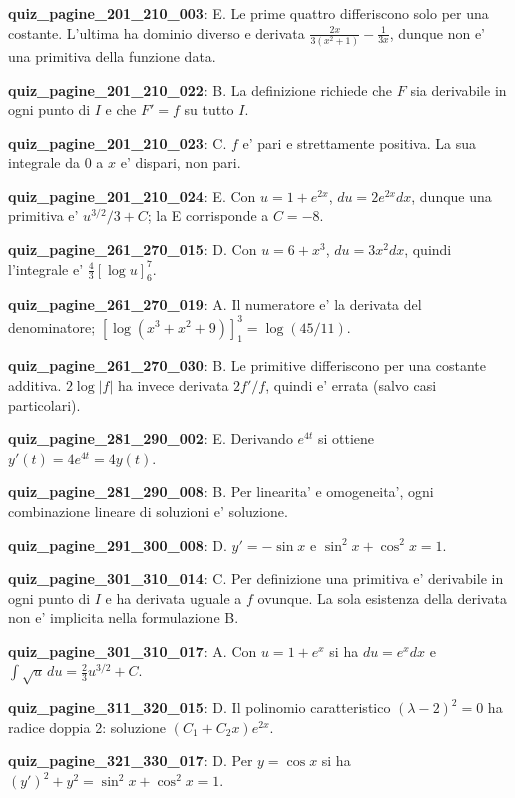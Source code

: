 \documentclass[11pt,a4paper]{article}
\newcounter{quiz}
\begin{document}
\noindent\textbf{quiz\_pagine\_201\_210\_003}: E. Le prime quattro differiscono solo per una costante. L'ultima ha dominio diverso e derivata $\frac{2x}{3(x^2+1)}-\frac1{3x}$, dunque non e' una primitiva della funzione data.\par\medskip
\noindent\textbf{quiz\_pagine\_201\_210\_022}: B. La definizione richiede che $F$ sia derivabile in ogni punto di $I$ e che $F'=f$ su tutto $I$.\par\medskip
\noindent\textbf{quiz\_pagine\_201\_210\_023}: C. $f$ e' pari e strettamente positiva. La sua integrale da $0$ a $x$ e' dispari, non pari.\par\medskip
\noindent\textbf{quiz\_pagine\_201\_210\_024}: E. Con $u=1+e^{2x}$, $du=2e^{2x}dx$, dunque una primitiva e' $u^{3/2}/3+C$; la E corrisponde a $C=-8$.\par\medskip
\noindent\textbf{quiz\_pagine\_261\_270\_015}: D. Con $u=6+x^3$, $du=3x^2dx$, quindi l'integrale e' $\frac43[\log u]_6^7$.\par\medskip
\noindent\textbf{quiz\_pagine\_261\_270\_019}: A. Il numeratore e' la derivata del denominatore; $[\log(x^3+x^2+9)]_1^3=\log(45/11)$.\par\medskip
\noindent\textbf{quiz\_pagine\_261\_270\_030}: B. Le primitive differiscono per una costante additiva. $2\log|f|$ ha invece derivata $2f'/f$, quindi e' errata (salvo casi particolari).\par\medskip
\noindent\textbf{quiz\_pagine\_281\_290\_002}: E. Derivando $e^{4t}$ si ottiene $y'(t)=4e^{4t}=4y(t)$.\par\medskip
\noindent\textbf{quiz\_pagine\_281\_290\_008}: B. Per linearita' e omogeneita', ogni combinazione lineare di soluzioni e' soluzione.\par\medskip
\noindent\textbf{quiz\_pagine\_291\_300\_008}: D. $y'=-\sin x$ e $\sin^2x+\cos^2x=1$.\par\medskip
\noindent\textbf{quiz\_pagine\_301\_310\_014}: C. Per definizione una primitiva e' derivabile in ogni punto di $I$ e ha derivata uguale a $f$ ovunque. La sola esistenza della derivata non e' implicita nella formulazione B.\par\medskip
\noindent\textbf{quiz\_pagine\_301\_310\_017}: A. Con $u=1+e^x$ si ha $du=e^x dx$ e $\int\sqrt u\,du=\frac23u^{3/2}+C$.\par\medskip
\noindent\textbf{quiz\_pagine\_311\_320\_015}: D. Il polinomio caratteristico $(\lambda-2)^2=0$ ha radice doppia 2: soluzione $(C_1+C_2x)e^{2x}$.\par\medskip
\noindent\textbf{quiz\_pagine\_321\_330\_017}: D. Per $y=\cos x$ si ha $(y\prime)^2+y^2=\sin^2x+\cos^2x=1$.\par\medskip
\end{document}
